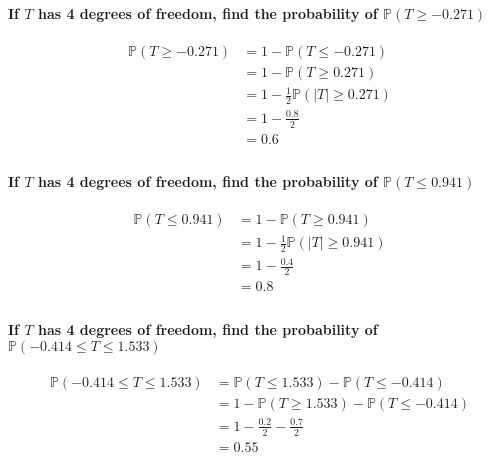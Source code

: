 \documentclass{article}
\renewcommand{\P}{\mathbb{P}}
\begin{document}
\paragraph{If \(T\) has 4 degrees of freedom, find the probability of \(\P (T \geq -0.271)\)\\}
\begin{align*}
  \P (T \geq -0.271)
   & = 1 - \P (T \leq -0.271)             \\
   & = 1 - \P (T \geq 0.271)              \\
   & = 1 - \frac{1}{2}\P (|T| \geq 0.271) \\
   & = 1 - \frac{0.8}{2}                  \\
   & = 0.6                                \\
\end{align*}

\paragraph{If \(T\) has 4 degrees of freedom, find the probability of \(\P (T \leq 0.941)\)\\}
\begin{align*}
  \P (T \leq 0.941)
   & = 1 - \P (T \geq 0.941)              \\
   & = 1 - \frac{1}{2}\P (|T| \geq 0.941) \\
   & = 1 - \frac{0.4}{2}                  \\
   & = 0.8                                \\
\end{align*}

\paragraph{If \(T\) has 4 degrees of freedom, find the probability of \(\P (-0.414 \leq T \leq 1.533)\)\\}
\begin{align*}
  \P (-0.414 \leq T \leq 1.533)
   & = \P (T \leq 1.533) - \P (T \leq -0.414)     \\
   & = 1 - \P (T \geq 1.533) - \P (T \leq -0.414) \\
   & = 1 - \frac{0.2}{2} - \frac{0.7}{2}          \\
   & = 0.55                                       \\
\end{align*}
\end{document}
